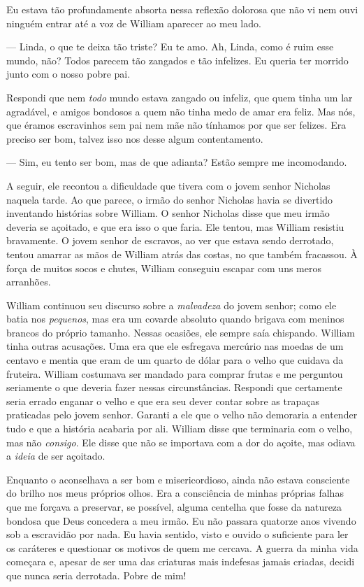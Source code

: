 Eu estava tão profundamente absorta
nessa reflexão dolorosa que não vi nem ouvi ninguém entrar até a voz de
William aparecer ao meu lado.

--- Linda, o que te deixa tão triste? Eu te amo. Ah, Linda, como é ruim
esse mundo, não? Todos parecem tão zangados e tão infelizes. Eu queria
ter morrido junto com o nosso pobre pai.

Respondi que nem \emph{todo} mundo
estava zangado ou infeliz, que quem tinha um lar agradável, e amigos
bondosos a quem não tinha medo de amar era feliz. Mas nós, que éramos
escravinhos sem pai nem mãe não tínhamos por que ser felizes. Era
preciso ser bom, talvez isso nos desse algum contentamento.

--- Sim, eu tento ser bom, mas de que
adianta? Estão sempre me incomodando.

A seguir, ele recontou a dificuldade que tivera com o jovem senhor
Nicholas naquela tarde. Ao que parece, o irmão do senhor Nicholas havia
se divertido inventando histórias sobre William. O senhor Nicholas disse
que meu irmão deveria se açoitado, e que era isso o que faria. Ele
tentou, mas William resistiu bravamente. O jovem senhor de escravos, ao
ver que estava sendo derrotado, tentou amarrar as mãos de William atrás
das costas, no que também fracassou. À força de muitos socos e chutes,
William conseguiu escapar com uns meros arranhões.

William continuou seu discurso sobre a
\emph{malvadeza} do jovem senhor; como ele batia nos \emph{pequenos},
mas era um covarde absoluto quando brigava com meninos brancos do
próprio tamanho. Nessas ocasiões, ele sempre saía chispando. William
tinha outras acusações. Uma era que ele esfregava mercúrio nas moedas de
um centavo e mentia que eram de um quarto de dólar para o velho que
cuidava da fruteira. William costumava ser mandado para comprar frutas e
me perguntou seriamente o que deveria fazer nessas circunstâncias.
Respondi que certamente seria errado enganar o velho e que era seu dever
contar sobre as trapaças praticadas pelo jovem senhor. Garanti a ele que
o velho não demoraria a entender tudo e que a história acabaria por ali.
William disse que terminaria com o velho, mas não \emph{consigo}. Ele
disse que não se importava com a dor do açoite, mas odiava a
\emph{ideia} de ser açoitado.

Enquanto o aconselhava a ser bom e
misericordioso, ainda não estava consciente do brilho nos meus próprios
olhos. Era a consciência de minhas próprias falhas que me forçava a
preservar, se possível, alguma centelha que fosse da natureza bondosa
que Deus concedera a meu irmão. Eu não passara quatorze anos vivendo sob
a escravidão por nada. Eu havia sentido, visto e ouvido o suficiente
para ler os caráteres e questionar os motivos de quem me cercava. A
guerra da minha vida começara e, apesar de ser uma das criaturas mais
indefesas jamais criadas, decidi que nunca seria derrotada. Pobre de
mim!

